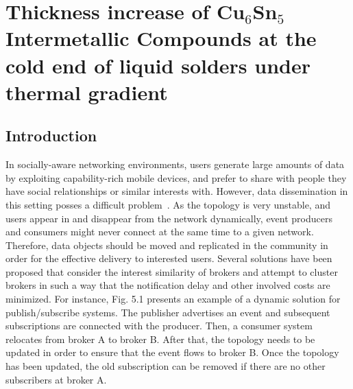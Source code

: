 \chapter{Thickness increase of Cu$_6$Sn$_5$ Intermetallic Compounds at the cold end of liquid solders under thermal gradient}\label{Chap5}

\section{Introduction}\label{Chap5_01}
In socially-aware networking environments, users generate large amounts of data by exploiting capability-rich mobile devices, and prefer to share with people they have social relationships or similar interests with. However, data dissemination in this setting posses a difficult problem~\cite{YZhu2013}. As the topology is very unstable, and users appear in and disappear from the network dynamically, event producers and consumers might never connect at the same time to a given network. Therefore, data objects should be moved and replicated in the community in order for the effective delivery to interested users.  Several solutions have been proposed that consider the interest similarity of brokers and attempt to cluster brokers in such a way that the notification delay and other involved costs are minimized. For instance,  Fig. 5.1 presents an example of a dynamic solution for publish/subscribe systems. The publisher advertises an event and subsequent subscriptions are connected with the producer. Then, a consumer system relocates from broker A to broker B. After that, the topology needs to be updated in order to ensure that the event flows to broker B. Once the topology has been updated, the old subscription can be removed if there are no other subscribers at broker A.

